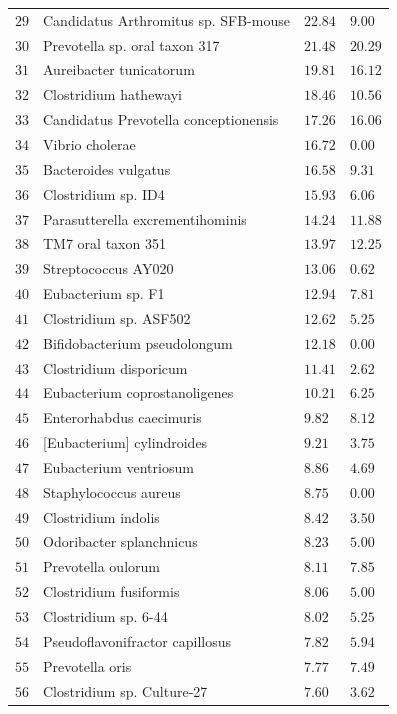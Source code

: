 \begin{center}
\begin{longtable}{|l|l|l|l|}
$29$ & Candidatus Arthromitus sp. SFB-mouse & $22.84$ & $9.00$ \\
$30$ & Prevotella sp. oral taxon 317 & $21.48$ & $20.29$ \\
$31$ & Aureibacter tunicatorum & $19.81$ & $16.12$ \\
$32$ & Clostridium hathewayi & $18.46$ & $10.56$ \\
$33$ & Candidatus Prevotella conceptionensis & $17.26$ & $16.06$ \\
$34$ & Vibrio cholerae & $16.72$ & $0.00$ \\
$35$ & Bacteroides vulgatus & $16.58$ & $9.31$ \\
$36$ & Clostridium sp. ID4 & $15.93$ & $6.06$ \\
$37$ & Parasutterella excrementihominis & $14.24$ & $11.88$ \\
$38$ & TM7 oral taxon 351 & $13.97$ & $12.25$ \\
$39$ & Streptococcus AY020 & $13.06$ & $0.62$ \\
$40$ & Eubacterium sp. F1 & $12.94$ & $7.81$ \\
$41$ & Clostridium sp. ASF502 & $12.62$ & $5.25$ \\
$42$ & Bifidobacterium pseudolongum & $12.18$ & $0.00$ \\
$43$ & Clostridium disporicum & $11.41$ & $2.62$ \\
$44$ & Eubacterium coprostanoligenes & $10.21$ & $6.25$ \\
$45$ & Enterorhabdus caecimuris & $9.82$ & $8.12$ \\
$46$ & [Eubacterium] cylindroides & $9.21$ & $3.75$ \\
$47$ & Eubacterium ventriosum & $8.86$ & $4.69$ \\
$48$ & Staphylococcus aureus & $8.75$ & $0.00$ \\
$49$ & Clostridium indolis & $8.42$ & $3.50$ \\
$50$ & Odoribacter splanchnicus & $8.23$ & $5.00$ \\
$51$ & Prevotella oulorum & $8.11$ & $7.85$ \\
$52$ & Clostridium fusiformis & $8.06$ & $5.00$ \\
$53$ & Clostridium sp. 6-44 & $8.02$ & $5.25$ \\
$54$ & Pseudoflavonifractor capillosus & $7.82$ & $5.94$ \\
$55$ & Prevotella oris & $7.77$ & $7.49$ \\
$56$ & Clostridium sp. Culture-27 & $7.60$ & $3.62$ \\

\end{longtable}
\end{center}
